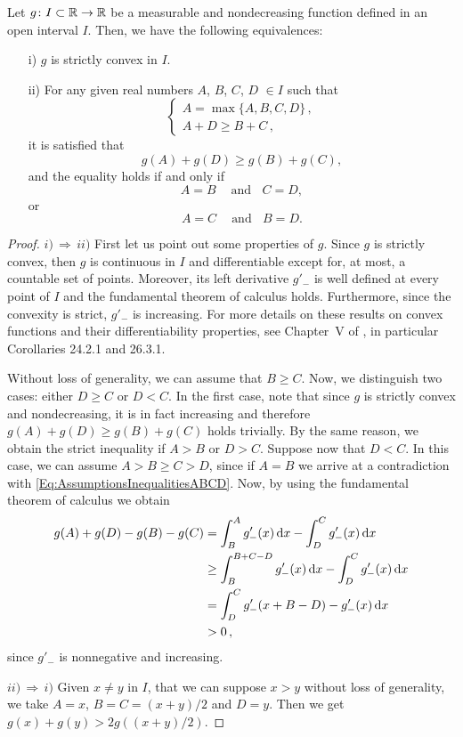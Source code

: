 \begin{lemma}
\label{Lemma:InequalitConvexFunctions} Let $g \colon I\subset \mathbb{R} \to \mathbb{R}$ be a measurable and nondecreasing function defined in
an open interval $I$. Then, we have the
following equivalences:
\begin{enumerate}
\item[i)] $g$ is strictly convex in $I$.
\item[ii)] For any given real numbers $A$, $B$, $C$, $D$ $\in I$ such that
\begin{equation}
\label{Eq:AssumptionsInequalitiesABCD}
\begin{cases}
A = \max\{A,B,C,D\}\,, \\
A + D \geq B + C\,,
\end{cases}
\end{equation}
it is satisfied that
$$
g(A) + g(D) \geq g(B) + g(C),
$$
and the equality holds if and only if
$$ A = B \ \ \ \ \textrm{ and} \ \ \ \ C=D, $$
or
$$ A = C \ \ \ \ \textrm{ and} \ \ \ \ B=D. $$
\end{enumerate}

\end{lemma}
\begin{proof}
$i)\, \Rightarrow \,ii)$ First let us point out some properties of $g$. Since $g$ is strictly convex, then $g$ is continuous in $I$ and differentiable except for, at most, a countable set of points.  Moreover, its left derivative $g'_-$ is well defined at every point of $I$ and the fundamental theorem of calculus holds. Furthermore, since the convexity is strict, $g'_-$ is increasing. For more details on these results on convex functions and their differentiability properties, see Chapter~V of \cite{Rockafellar1970}, in particular Corollaries 24.2.1 and 26.3.1.

Without loss of generality, we can assume that $B \geq C$. Now, we distinguish two cases: either $D \geq C$ or $D < C$. In the first case, note that since $g$ is strictly convex and nondecreasing, it is in fact increasing and therefore $g(A) + g(D) \geq g(B) + g(C)$ holds trivially. By the same reason, we obtain the strict inequality if $A>B$ or $D>C$. Suppose now that $D < C$. In this case, we can assume $A > B \geq C > D$, since if $A = B$ we arrive at a contradiction with \eqref{Eq:AssumptionsInequalitiesABCD}. Now, by using the fundamental theorem of calculus we obtain
\begin{align*}
g(A) + g(D) - g(B) - g(C) &= \int_B^A g'_-(x) \,\mathrm{d} x - \int_D^C g'_-(x) \,\mathrm{d} x \\
&\geq \int_B^{B+C-D} g'_-(x) \,\mathrm{d} x - \int_D^C g'_-(x) \,\mathrm{d} x  \\
&= \int_D^C g'_-(x+B-D) - g'_-(x) \,\mathrm{d} x  \\
& > 0\,,
\end{align*}
since $g'_-$ is nonnegative and increasing.

$ii)\, \Rightarrow \,i)$ Given $x\neq y$ in $I$, that we can suppose $x>y$ without loss of generality, we take $A=x$, $B=C=(x+y)/2$ and $D=y$. Then we get $ g(x)+g(y) > 2g\left( (x+y)/2 \right)$.
\end{proof}

